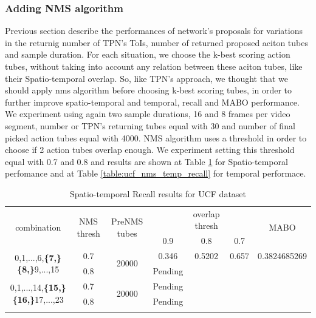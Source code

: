 \documentclass{report}
\begin{document}
\subsubsection{Adding NMS algorithm}

Previous section describe the performances of network's proposals for variations in the returnig number of TPN's ToIs, number of returned
proposed aciton tubes and sample duration. For each situation, we choose the k-best scoring action tubes, without taking into account
any relation between these aciton tubes, like their Spatio-temporal overlap. So, like TPN's approach, we thought that we should apply
nms algorithm before choosing k-best scoring tubes, in order to further improve  spatio-temporal and temporal, recall and MABO  performance.
We experiment using again two sample durations, 16 and 8 frames per video segment, number or TPN's returning tubes equal with 30 and
number of final picked action tubes equal with 4000. NMS algorithm uses a threshold in order to choose if 2 action tubes overlap enough. We
experiment setting this threshold equal with 0.7 and 0.8 and results are shown at Table \ref{table:ucf_nms_recall} for Spatio-temporal
perfomance and at Table \ref{table:ucf_nms_temp_recall} for temporal performace.

\begin{center}
  \setlength{\tabcolsep}{2pt}
\begin{longtable}{||c | c | c ||c c c| c|}

  \hline
  \multirow{2}{*}{combination} & \multirow{2}{2.5em}{NMS thresh} & \multirow{2}{3.5em}{PreNMS tubes} &  {} &overlap thresh & {} & \multirow{2}{*}{MABO} \\
  {} & {} & {} &  0.9 &  0.8 & 0.7 & {}\\         
  \hline
  \multirow{2}{7em}{0,1,...,6,\textbf{\{7,\}}
  \textbf{\{8,\}}9,...,15 }  & 0.7 &\multirow{2}{*}{20000}  & 0.346 & 0.5202 & 0.657 & 0.3824685269 \\
  \cline{2-2} \cline{4-7} 
  {} &  0.8   & {}   & Pending \\
  \hline                                    
  \multirow{2}{7em}{0,1,...,14,\textbf{\{15,\}}
  \textbf{\{16,\}}17,...,23 }  & 0.7 & \multirow{2}{*}{20000}   & Pending \\
  \cline{2-2} \cline{4-7} 
                                    {} &  0.8   & {}   & Pending \\
  \hline                                    

  \caption{Spatio-temporal Recall results for UCF dataset}
  \label{table:ucf_nms_recall}
\end{longtable} 
\end{center}
\end{document}
